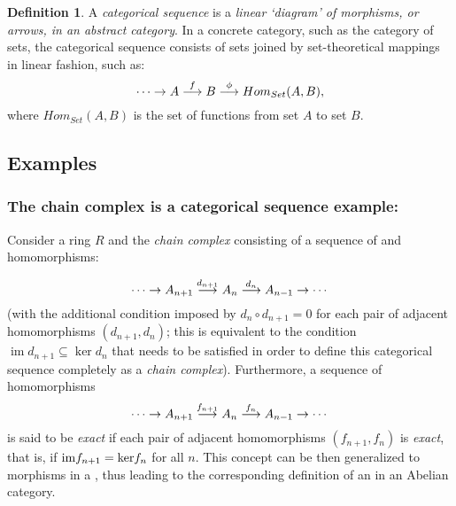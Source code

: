 \documentclass[12pt]{article}
\def\im{\operatorname{im}}
\def\ker{\operatorname{ker}}
\theoremstyle{plain}
\theoremstyle{definition}
\newtheorem{definition}{Definition}[section]
\numberwithin{equation}{section}
\begin{document}
\begin{definition}
A \emph{categorical sequence} is a \emph{linear `diagram' of morphisms, or arrows, in an abstract category}. 
In a concrete category, such as the category of sets, the categorical sequence consists of sets joined by set-theoretical mappings in linear fashion, such as: 
\[
\cdots \rightarrow
A\buildrel f \over \longrightarrow
B \buildrel \phi \over  \longrightarrow
Hom_{Set}(A,B),
\]
where $Hom_{Set}(A,B)$ is the set of functions from set $A$ to set $B$.
\end{definition}


\subsection{Examples}

\subsubsection{The chain complex is a categorical sequence example:}

 Consider a ring $R$ and the \emph{chain complex} consisting of
a sequence of  and homomorphisms:

\[
\cdots \rightarrow
A_{n+1} \buildrel {d_{n+1}} \over \longrightarrow
A_n \buildrel {d_n} \over \longrightarrow
A_{n-1} \rightarrow
\cdots
\]
(with the additional condition imposed by $d_n\circ d_{n+1} = 0$ for each pair of adjacent homomorphisms $(d_{n+1}, d_n)$; this is equivalent to the condition $\im d_{n+1} \subseteq \ker d_n$ that needs to be satisfied in order to define this categorical sequence completely as a \emph{chain complex}). Furthermore, a sequence of homomorphisms
$$
\cdots \rightarrow
A_{n+1} \buildrel {f_{n+1}} \over \longrightarrow
A_n \buildrel {f_n} \over \longrightarrow
A_{n-1} \rightarrow
\cdots
$$
is said to be {\it exact} if each pair of adjacent homomorphisms $(f_{n+1}, f_n)$ is \emph{exact}, that is, 
if ${\rm im} f_{n+1} = {\rm ker} f_n$ for all $n$. This concept can be then generalized to  
morphisms in a , thus leading to the corresponding 
definition of an  in an Abelian category. 
\end{document}
